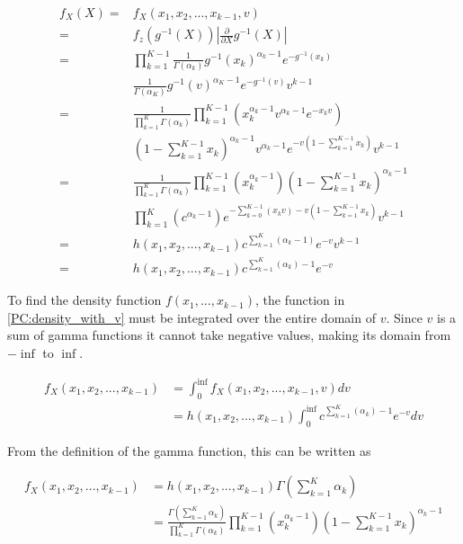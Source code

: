 \begin{align}
    f_X(X) ={}&  f_X(x_1, x_2, ..., x_{k-1}, v) \label{PC:density_with_v}\\
    ={}& f_z(g^{-1}(X)) \left| \frac{\partial}{\partial X} g^{-1}(X) \right|\\
    ={}& \prod_{k=1}^{K-1} \frac{1}{\Gamma(\alpha_k)} g^{-1}(x_k)^{\alpha_k -1} e^{-g^{-1}(x_k)} \\
    {}& \frac{1}{\Gamma(\alpha_K)} g^{-1}(v)^{\alpha_K -1} e^{-g^{-1}(v)} v^{k-1}\\
    ={}& \frac{1}{\prod_{k=1}^K \Gamma(\alpha_k)} \prod_{k=1}^{K-1} \left( x_k^{\alpha_k-1} v^{\alpha_k-1} e^{-x_k v} \right)\\
    {}& \left( 1 - \sum_{k=1}^{K-1} x_k \right)^{\alpha_k-1} v^{\alpha_k-1} e^{-v \left( 1 - \sum_{k=1}^{K-1} x_k \right)}  v^{k-1}\\
    ={}& \frac{1}{\prod_{k=1}^K \Gamma(\alpha_k)} \prod_{k=1}^{K-1} \left( x_k^{\alpha_k-1} \right) \left( 1 - \sum_{k=1}^{K-1} x_k \right)^{\alpha_k-1} \\
    {}& \prod_{k=1}^{K} \left( c^{\alpha_k-1}\right) e^{-\sum_{k=0}^{K-1} (x_k v) - v \left( 1 - \sum_{k=1}^{K-1} x_k \right) }  v^{k-1}\\
    ={}& h(x_1,x_2,...,x_{k-1}) c^{\sum_{k=1}^{K}(\alpha_k-1)} e^{-v }  v^{k-1} \\
    ={}&h(x_1,x_2,...,x_{k-1}) c^{\sum_{k=1}^{K}(\alpha_k)-1} e^{-v}
\end{align}

To find the density function $f(x_1,...,x_{k-1})$, the function in \ref{PC:density_with_v} must be integrated over the entire domain of $v$. Since $v$ is a sum of gamma functions it cannot take negative values, making its domain from $-\inf$ to $\inf$.

\begin{align}
    f_X(x_1, x_2, ..., x_{k-1}) &= \int_{0}^{\inf} f_X(x_1, x_2, ..., x_{k-1},v) dv\\
    &= h(x_1,x_2,...,x_{k-1}) \int_{0}^{\inf} c^{\sum_{k=1}^{K}(\alpha_k)-1} e^{-v} dv
\end{align}

From the definition of the gamma function, this can be written as

\begin{align}
    f_X(x_1, x_2, ..., x_{k-1}) &= h(x_1,x_2,...,x_{k-1}) \Gamma(\sum_{k=1}^{K}\alpha_k) \\
    &= \frac{\Gamma(\sum_{k=1}^{K}\alpha_k)}{\prod_{k=1}^K \Gamma(\alpha_k)} \prod_{k=1}^{K-1} \left( x_k^{\alpha_k-1} \right) \left( 1 - \sum_{k=1}^{K-1} x_k \right)^{\alpha_k-1}
\end{align}

